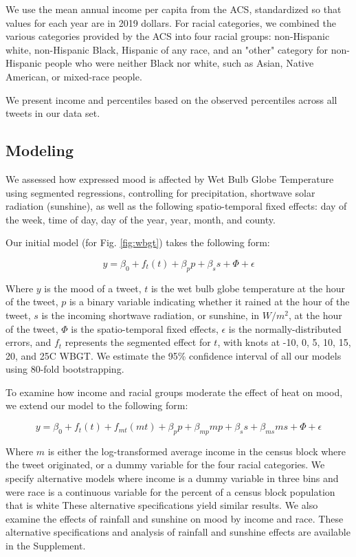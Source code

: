 \documentclass[titlepage]{article}
\begin{document}
We use the mean annual income per capita from the ACS, standardized so that values for each year are in 2019 dollars. For racial categories, we combined the various categories provided by the ACS into four racial groups: non-Hispanic white, non-Hispanic Black, Hispanic of any race, and an "other" category for non-Hispanic people who were neither Black nor white, such as Asian, Native American, or mixed-race people.

We present income and percentiles based on the observed percentiles across all tweets in our data set.
 
\subsection*{Modeling}
We assessed how expressed mood is affected by Wet Bulb Globe Temperature using segmented regressions, controlling for precipitation, shortwave solar radiation (sunshine), as well as the following spatio-temporal fixed effects: day of the week, time of day, day of the year, year, month, and county. 

Our initial model (for Fig. \ref{fig:wbgt}) takes the following form:

\begin{equation}
 y = \beta_0 + f_t(t) + \beta_p p + \beta_s s + \Phi + \epsilon
 \label{mod:1}
\end{equation}

Where $y$ is the mood of a tweet, $t$ is the wet bulb globe temperature at the hour of the tweet, $p$ is a binary variable indicating whether it rained at the hour of the tweet, $s$ is the incoming shortwave radiation, or sunshine, in $W/m^2$, at the hour of the tweet, $\Phi$ is the spatio-temporal fixed effects, $\epsilon$ is the normally-distributed errors, and $f_t$ represents the segmented effect for $t$, with knots at -10\textdegree, 0\textdegree, 5\textdegree, 10\textdegree, 15\textdegree, 20\textdegree, and 25\textdegree C WBGT. We estimate the 95\% confidence interval of all our models using 80-fold bootstrapping. 

To examine how income and racial groups moderate the effect of heat on mood, we extend our model to the following form:

\begin{equation}
 y = \beta_0 + f_t(t) + f_{mt}(m t) + \beta_p p + \beta_{mp} m p + \beta_s s + \beta_{ms} m s + \Phi + \epsilon
 \label{mod:2}
\end{equation}

Where $m$ is either the log-transformed average income in the census block where the tweet originated, or a dummy variable for the four racial categories. We specify alternative models where income is a dummy variable in three bins and were race is a continuous variable for the percent of a census block population that is white These alternative specifications yield similar results. We also examine the effects of rainfall and sunshine on mood by income and race. These alternative specifications and analysis of rainfall and sunshine effects are available in the Supplement.
\end{document}
